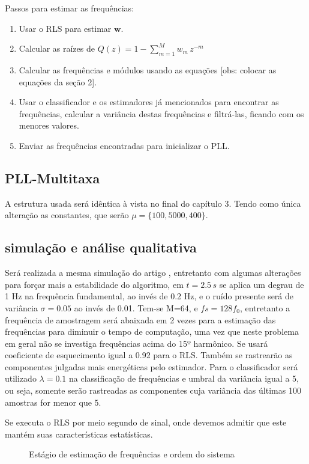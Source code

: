 Passos para estimar as frequências:

\begin{enumerate}
	\item Usar o RLS para estimar $\boldsymbol{w}$.
	\item Calcular as raízes de $Q(z)=1-\sum_{m=1}^{M}w_m \, z^{-m}$
	\item Calcular as frequências e módulos usando as equações [obs: colocar as equações da seção 2].
	\item Usar o classificador e os estimadores já mencionados para encontrar as frequências, calcular a variância destas frequências e filtrá-las, ficando com os menores valores.
	\item Enviar as frequências encontradas para inicializar o PLL.  
\end{enumerate}
	
\subsection{PLL-Multitaxa}
A estrutura usada será idêntica à vista no final do capítulo 3. Tendo como única alteração as constantes, que serão $\mu=\{100, 5000, 400\}$.

\subsection{simulação e análise qualitativa}
Será realizada a mesma simulação do artigo \cite{chang2009two}, entretanto com algumas alterações para forçar mais a estabilidade do algoritmo, em $t=2.5 \, s$ se aplica um degrau de 1 Hz na frequência fundamental, ao invés de 0.2 Hz, e o ruído presente será de variância $\sigma=0.05$ ao invés de 0.01. Tem-se M=64, e $fs=128f_0$, entretanto a frequência de amostragem será abaixada em 2 vezes para a estimação das frequências para diminuir o tempo de computação, uma vez que neste problema em geral não se investiga frequências acima do 15º harmônico. Se usará coeficiente de esquecimento igual a 0.92 para o RLS. Também se rastrearão as componentes julgadas mais energéticas pelo estimador. Para o classificador será utilizado $\lambda=0.1$ na classificação de frequências e umbral da variância igual a 5, ou seja, somente serão rastreadas as componentes cuja variância das últimas 100 amostras for menor que 5. 

Se executa o RLS por meio segundo de sinal, onde devemos admitir que este mantém suas características estatísticas.

\begin{figure}[H]
	\centering    
	\def\svgwidth{\columnwidth}
	
	\caption{Estágio de estimação de frequências e ordem do sistema}
	\label{fig:estagio_1}
\end{figure}

